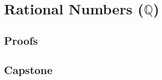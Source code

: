 \chapter{\texorpdfstring{Rational Numbers ($\mathbb{Q}$)}{Rational Numbers (Q)}}
\label{ch:rationals}




\LRAExcludeFromPrintEditionBegin
\section*{Proofs}


\section*{Capstone}
\LRAExcludeFromPrintEditionEnd
